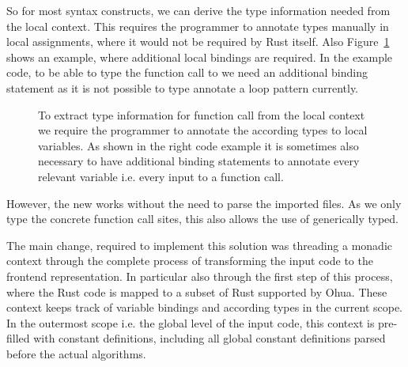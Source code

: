 So for most syntax constructs, we can derive the type information needed from the local context. This requires the programmer to annotate types manually in local assignments, where it would not be required by Rust itself. Also Figure~\ref{fig:TypeExtractionExample} shows an example, where additional local bindings are required. In the example code, to be able to type the function call to  we need an additional binding statement as it is not possible to type annotate a loop pattern currently. 

\begin{figure}[H]
\centering
\tabskip=0pt
\caption{To extract type information for function call from the local context we require the  programmer to annotate the according types to local variables. As shown in the right code example it is sometimes also necessary to have additional binding statements to annotate every relevant variable i.e. every input to a function call.}
\label{fig:TypeExtractionExample}
\end{figure}

However, the new  works without the need to parse the imported files. As we only type the concrete function call sites, this also allows the use of generically typed.\\

The main change, required to implement this solution was threading a monadic context through the complete process of transforming the input code to the frontend representation. In particular also through the first step of this process, where the Rust code is mapped to a subset of Rust supported by Ohua. These context keeps track of variable bindings and according types in the current scope. In the outermost scope i.e. the global level of the input code, this context is pre-filled with constant definitions, including all global constant definitions parsed before the actual algorithms. 

